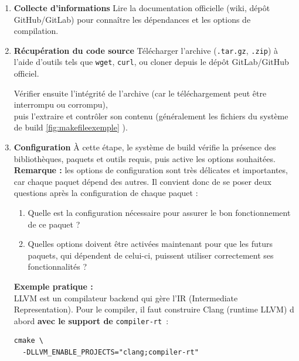 \begin{enumerate}
  \item \textbf{Collecte d’informations}  
    Lire la documentation officielle (wiki, dépôt GitHub/GitLab) pour connaître les dépendances et les options de compilation.\\
    

  \item \textbf{Récupération du code source}  
    Télécharger l’archive (\texttt{.tar.gz}, \texttt{.zip}) à l’aide d’outils tels que \texttt{wget}, \texttt{curl}, ou cloner depuis le dépôt GitLab/GitHub officiel.  
   
    Vérifier ensuite l’intégrité de l’archive (car le téléchargement peut être interrompu ou corrompu),\\ 
     puis l’extraire  et contrôler son contenu (généralement les fichiers du système de build \textcolor{blue}{\ref{fig:makefileexemple}}  ).\\

 \item \textbf{Configuration}  
    À cette étape, le système de build vérifie la présence des bibliothèques, paquets et outils requis, puis active les options souhaitées.  \\

    \textbf{Remarque :} les options de configuration sont très délicates et importantes, car chaque paquet dépend des autres. Il convient donc de se poser deux questions après la configuration de chaque paquet :
    \begin{enumerate}[label=\arabic*)]
      \item Quelle est la configuration nécessaire pour assurer le bon fonctionnement de ce paquet ?
      \item Quelles options doivent être activées maintenant pour que les futurs paquets, qui dépendent de celui-ci, puissent utiliser correctement ses fonctionnalités ?
    \end{enumerate}


    \medskip
    \noindent\textbf{Exemple pratique :} \\ 
    LLVM est un compilateur backend qui gère l’IR (Intermediate Representation). Pour le compiler, il faut construire Clang  (runtime LLVM) d abord  \textbf{avec le support de}  \texttt{compiler-rt} :

    \begin{verbatim}
cmake \
  -DLLVM_ENABLE_PROJECTS="clang;compiler-rt"
    \end{verbatim}
    

\end{enumerate}
